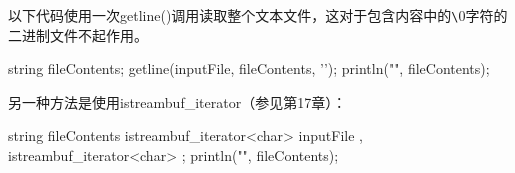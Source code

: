 以下代码使用一次getline()调用读取整个文本文件，这对于包含内容中的\verb|\|0字符的二进制文件不起作用。

\begin{cpp}
string fileContents;
getline(inputFile, fileContents, '\0');
println("{}", fileContents);
\end{cpp}

另一种方法是使用istreambuf\_iterator（参见第17章）：

\begin{cpp}
string fileContents {
    istreambuf_iterator<char> { inputFile },
    istreambuf_iterator<char> { }
};
println("{}", fileContents);
\end{cpp}













